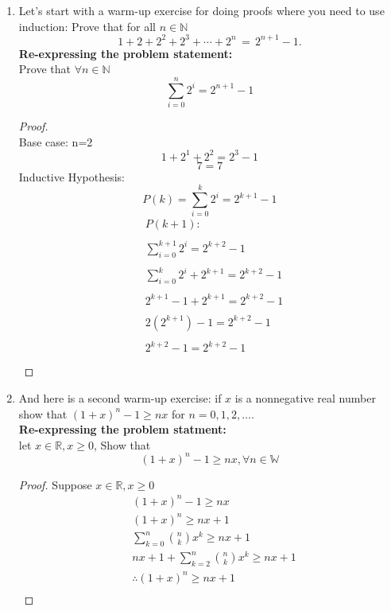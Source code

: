 \documentclass[11pt]{article}
\theoremstyle{definition}  %
\newcommand{\N}{\mathbb{N}}
\newcommand{\R}{\mathbb{R}}
\begin{document}

\begin{enumerate}

\item Let's start with a warm-up exercise for doing proofs where you need to use induction:  Prove that for all $n \in \N$
  $$ 1 + 2 + 2^2 + 2^3 + \cdots + 2^n \, = \, 2^{n+1} - 1.$$
  \textbf{Re-expressing the problem statement: }\\
  Prove that $\forall n \in \N$
  \[
    \sum_{i=0}^n2^i=2^{n+1}-1
  \]
  \begin{proof}\\
    Base case: n=2\\
    $$1+2^1+2^2=2^3-1$$
    $$7=7$$
    Inductive Hypothesis: \\
    $$P(k)=  \sum_{i=0}^k2^i=2^{k+1}-1$$
    \begin{align*}
      &P(k+1):\\\\
      &\sum_{i=0}^{k+1}2^i=2^{k+2}-1\\\\
      &\sum_{i=0}^{k}2^i+2^{k+1}=2^{k+2}-1\\\\
      &2^{k+1}-1+2^{k+1}=2^{k+2}-1\\\\
        &2(2^{k+1})-1=2^{k+2}-1\\\\
          &2^{k+2}-1=2^{k+2}-1\\\\
    \end{align*}
  \end{proof}
\item And here is a second warm-up exercise: if $x$ is a nonnegative real number show that $(1 + x)^n - 1 \geq nx$ for $n=0, 1, 2, \ldots$.\\
\textbf{Re-expressing the problem statment:}\\
let $x\in \R, x\geq 0$, Show that
\[
  (1 + x)^n - 1 \geq nx, \forall n \in \mathbb{W}
\]
\begin{proof}
  Suppose  $x\in \R, x\geq 0$
\begin{align*}
  &(1 + x)^n - 1 \geq nx\\
  &(1 + x)^n\geq nx+1\\
  &\sum_{k=0}^n\binom{n}{k}x^k\geq nx+1\\
  &nx+1+\sum_{k=2}^n\binom{n}{k}x^k\geq nx+1\\
  &\therefore (1 + x)^n\geq nx+1\\

\end{align*}
\end{proof}
\end{enumerate}
\end{document}
